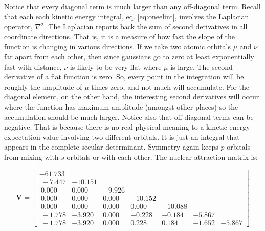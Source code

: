 \documentclass[
  9pt,
]{extbook}
\theoremstyle{definition}
\theoremstyle{definition}
\theoremstyle{definition}
\theoremstyle{remark}
\begin{document}
Notice that every diagonal term is much larger than any off-diagonal term. Recall that each each kinetic energy integral, eq. \eqref{eq:oneelint}, involves the Laplacian operator, \(\nabla^2\). The Laplacian reports back the sum of second derivatives in all coordinate directions. That is, it is a measure of how fast the slope of the function is changing in various directions. If we take two atomic orbitals \(\mu\) and \(\nu\) far apart from each other, then since gaussians go to zero at least exponentially fast with distance, \(\nu\) is likely to be very flat where \(\mu\) is large. The second derivative of a flat function is zero. So, every point in the integration will be roughly the amplitude of \(\mu\) times zero, and not much will accumulate. For the diagonal element, on the other hand, the interesting second derivatives will occur where the function has maximum amplitude (amongst other places) so the accumulation should be much larger. Notice also that off-diagonal terms can be negative. That is because there is no real physical meaning to a kinetic energy expectation value involving two different orbitals. It is just an integral that appears in the complete secular determinant. Symmetry again keeps \(p\) orbitals from mixing with \(s\) orbitals or with each other. The nuclear attraction matrix is:

\begin{equation}
\mathbf{V}=
\begin{bmatrix}
-61.733 & & & & & & \\\ 
-7.447 & -10.151 & & & & &  \\\
0.000 & 0.000 & -9.926 & & & & \\\
0.000 & 0.000 & 0.000 & -10.152 & & & \\\
0.000 & 0.000 & 0.000 & 0.000 & -10.088 & & \\\
-1.778 & -3.920 & 0.000 & -0.228 & -0.184 & -5.867 & \\\
-1.778 & -3.920 & 0.000 & 0.228 & 0.184 & -1.652 & -5.867
\end{bmatrix}
\label{eq:vmatrix}
\end{equation}
\end{document}
